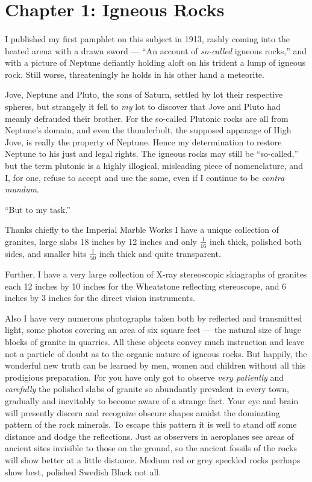 \documentclass[a4paper, 12pt, oneside]{article}
\begin{document}
\section{Chapter 1: Igneous Rocks}
\paragraph{}
I published my first pamphlet on this subject in 1913, rashly coming into the heated arena with a drawn sword --- ``An account of \emph{so-called} igneous rocks,'' and with a picture of Neptune defiantly holding aloft on his trident a lump of igneous rock. Still worse, threateningly he holds in his other hand a meteorite.

Jove, Neptune and Pluto, the sons of Saturn, settled by lot their respective spheres, but strangely it fell to \emph{my} lot to discover that Jove and Pluto had meanly defrauded their brother. For the so-called Plutonic rocks are all from Neptune's domain, and even the thunderbolt, the supposed appanage of High Jove, is really the property of Neptune. Hence my determination to restore Neptune to his just and legal rights. The igneous rocks may still be ``so-called,'' but the term plutonic is a highly illogical, misleading piece of nomenclature, and I, for one, refuse to accept and use the same, even if I continue to be \emph{contra mundum}.

``But to my task.''

Thanks chiefly to the Imperial Marble Works I have a unique collection of granites, large slabs 18 inches by 12 inches and only $\frac{1}{16}$ inch thick, polished both sides, and smaller bits $\frac{1}{50}$ inch thick and quite transparent.

Further, I have a very large collection of X-ray stereoscopic skiagraphs of granites each 12 inches by 10 inches for the Wheatstone reflecting stereoscope, and 6 inches by 3 inches for the direct vision instruments.

Also I have very numerous photographs taken both by reflected and transmitted light, some photos covering an area of six square feet --- the natural size of huge blocks of granite in quarries. All these objects convey much instruction and leave not a particle of doubt as to the organic nature of igneous rocks. But happily, the wonderful new truth can be learned by men, women and children without all this prodigious preparation. For you have only got to observe \emph{very patiently} and \emph{carefully} the polished slabs of granite so abundantly prevalent in every town, gradually and inevitably to become aware of a strange fact. Your eye and brain will presently discern and recognize obscure shapes amidst the dominating pattern of the rock minerals. To escape this pattern it is well to stand off some distance and dodge the reflections. Just as observers in aeroplanes see areas of ancient sites invisible to those on the ground, so the ancient fossils of the rocks will show better at a little distance. Medium red or grey speckled rocks perhaps show best, polished Swedish Black not all.
\end{document}
